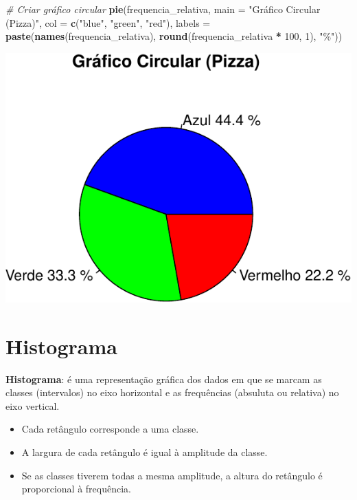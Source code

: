 \documentclass[
]{book}
\newenvironment{Shaded}{\begin{snugshade}}{\end{snugshade}}
\newcommand{\AttributeTok}[1]{\textcolor[rgb]{0.13,0.29,0.53}{#1}}
\newcommand{\CommentTok}[1]{\textcolor[rgb]{0.56,0.35,0.01}{\textit{#1}}}
\newcommand{\DecValTok}[1]{\textcolor[rgb]{0.00,0.00,0.81}{#1}}
\newcommand{\FunctionTok}[1]{\textcolor[rgb]{0.13,0.29,0.53}{\textbf{#1}}}
\newcommand{\NormalTok}[1]{#1}
\newcommand{\SpecialCharTok}[1]{\textcolor[rgb]{0.81,0.36,0.00}{\textbf{#1}}}
\newcommand{\StringTok}[1]{\textcolor[rgb]{0.31,0.60,0.02}{#1}}
\begin{document}
\begin{Shaded}
\begin{Highlighting}[]
\CommentTok{\# Criar gráfico circular}
\FunctionTok{pie}\NormalTok{(frequencia\_relativa, }
    \AttributeTok{main =} \StringTok{"Gráfico Circular (Pizza)"}\NormalTok{,}
    \AttributeTok{col =} \FunctionTok{c}\NormalTok{(}\StringTok{"blue"}\NormalTok{, }\StringTok{"green"}\NormalTok{, }\StringTok{"red"}\NormalTok{),}
    \AttributeTok{labels =} \FunctionTok{paste}\NormalTok{(}\FunctionTok{names}\NormalTok{(frequencia\_relativa), }
                   \FunctionTok{round}\NormalTok{(frequencia\_relativa }\SpecialCharTok{*} \DecValTok{100}\NormalTok{, }\DecValTok{1}\NormalTok{), }\StringTok{"\%"}\NormalTok{))}
\end{Highlighting}
\end{Shaded}

\includegraphics{introR_files/figure-latex/unnamed-chunk-167-1.pdf}

\section{Histograma}\label{histograma}

\textbf{Histograma}: é uma representação gráfica dos dados em que se marcam
as classes (intervalos) no eixo horizontal e as frequências (absuluta ou
relativa) no eixo vertical.

\begin{itemize}
\item
  Cada retângulo corresponde a uma classe.
\item
  A largura de cada retângulo é igual à amplitude da classe.
\item
  Se as classes tiverem todas a mesma amplitude, a altura do retângulo é proporcional à frequência.
\end{itemize}
\end{document}
